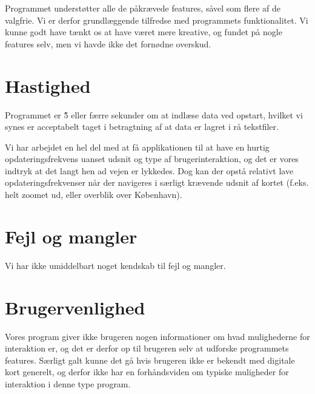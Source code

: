Programmet understøtter alle de påkrævede features, såvel som flere af de valgfrie. Vi er derfor grundlæggende tilfredse med programmets funktionalitet. Vi kunne godt have tænkt os at have været mere kreative, og fundet på nogle features selv, men vi havde ikke det fornødne overskud.

\section{Hastighed}

Programmet er \~5 eller færre sekunder om at indlæse data ved opstart, hvilket vi synes er acceptabelt taget i betragtning af at data er lagret i rå tekstfiler.

Vi har arbejdet en hel del med at få applikationen til at have en hurtig opdateringsfrekvens uanset udsnit og type af brugerinteraktion, og det er vores indtryk at det langt hen ad vejen er lykkedes. Dog kan der opstå relativt lave opdateringsfrekvenser når der navigeres i særligt krævende udsnit af kortet (f.eks. helt zoomet ud, eller overblik over København).

\section{Fejl og mangler}

Vi har ikke umiddelbart noget kendskab til fejl og mangler.

\section{Brugervenlighed}

Vores program giver ikke brugeren nogen informationer om hvad mulighederne for interaktion er, og det er derfor op til brugeren selv at udforske programmets features. Særligt galt kunne det gå hvis brugeren ikke er bekendt med digitale kort generelt, og derfor ikke har en forhåndsviden om typiske muligheder for interaktion i denne type program.